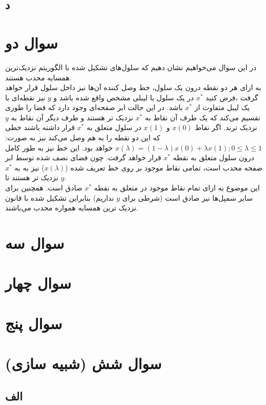 \documentclass[12pt,onecolumn,a4paper]{article}
\begin{document}
\subsection*{د}

\newpage
\section{سوال دو}
در این سوال می‌خواهیم نشان دهیم که سلول‌های  تشکیل شده با الگوریتم نزدیک‌ترین همسایه محدب هستند. \\
به ازای هر دو نقطه درون یک سلول، خط وصل کننده آن‌ها نیز داخل سلول قرار خواهد گرفت ،فرض کنید $x^{*}$ در یک سلول با لیبلی مشخص واقع شده باشد و $y$ نیز نقطه‌ای با یک لیبل متفاوت از $x^{*}$ باشد. در این حالت ابر صفحه‌ای وجود دارد که فضا را طوری تقسیم می‌کند که یک طرف آن نقاط به $x^{*}$ نزدیک تر هستند و طرف دیگر آن نقاط به $y$ نزدیک ترند. اگر نقاط $x(0)$ و $x(1)$ در سلول متعلق به $x^{*}$ قرار داشته باشند خطی که این دو نقطه را به هم وصل می‌کند نیز به صورت: $x(\lambda) = (1 - \lambda)x(0) + \lambda x(1); 0 \leq \lambda \leq 1$ خواهد بود. این خط نیز به طور کامل درون سلول متعلق به نقطه $x^{*}$ قرار خواهد گرفت.
چون فضای نصف شده توسط ابر صفحه محدب است، تمامی نقاط موجود بر روی خط تعریف شده ($x(\lambda)$) نیز به به $x^{*}$ نزدیک تر هستند تا $y$. \\
این موضوع به ازای تمام نقاط موجود در  متعلق به نقطه $x^{*}$ صادق است. همچنین برای سایر سمپل‌ها نیز صادق است (شرطی برای $y$ نداریم) بنابراین  تشکیل شده با قانون نزدیک ترین همسایه همواره محدب می‌باشند.
\newpage
\section{سوال سه}

\newpage
\section{سوال چهار}

\newpage
\section{سوال پنج}

\newpage
\section{سوال شش (شبیه سازی)}
\subsection*{الف}
\end{document}
